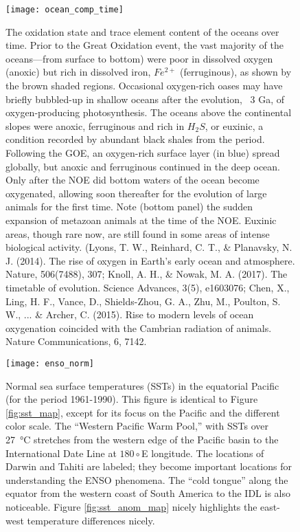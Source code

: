 {\begin{figure}[ht]
\label{fig:historic_sst}
\end{figure}


\newpage
\begin{figure}[ht]
\centering
\texttt{[image: ocean\_comp\_time]}%
\caption{The oxidation state and trace element content of the oceans over time. Prior to the Great Oxidation event, the vast majority of the oceans---from surface to bottom) were poor in dissolved oxygen (anoxic) but rich in dissolved  iron, $Fe^{2+}$ (ferruginous), as shown by the brown shaded regions. Occasional oxygen-rich oases may have briefly bubbled-up in shallow oceans after the evolution, ~3 Ga, of oxygen-producing photosynthesis. The oceans above the continental slopes were anoxic, ferruginous and rich in $H_2S$, or euxinic, a condition recorded by abundant black shales from the period. Following the GOE, an oxygen-rich surface layer (in blue) spread globally, but anoxic and ferruginous continued in the deep ocean. Only after the NOE did bottom waters of the ocean become oxygenated, allowing soon thereafter for the evolution of large animals for the first time. Note (bottom panel) the sudden expansion of metazoan animals at the time of the NOE. Euxinic areas, though rare now, are still found in some areas of intense biological activity. (Lyons, T. W., Reinhard, C. T., \& Planavsky, N. J. (2014). The rise of oxygen in Earth's early ocean and atmosphere. Nature, 506(7488), 307; Knoll, A. H., \& Nowak, M. A. (2017). The timetable of evolution. Science Advances, 3(5), e1603076; Chen, X., Ling, H. F., Vance, D., Shields-Zhou, G. A., Zhu, M., Poulton, S. W., ... \& Archer, C. (2015). Rise to modern levels of ocean oxygenation coincided with the Cambrian radiation of animals. Nature Communications, 6, 7142.}   
\label{fig:ocean_comp}
\end{figure} 

\newpage
\begin{figure}[ht]
\centering
\texttt{[image: enso\_norm]}%
\caption{Normal sea surface temperatures (SSTs) in the equatorial Pacific (for the period 1961-1990). This figure is identical to Figure \ref{fig:sst_map}, except for its focus on the Pacific and the different color scale. The ``Western Pacific Warm Pool,'' with SSTs over \SI{27}{\celsius} stretches from the western edge of the Pacific basin to the International Date Line at $180\circ$E longitude. The locations of Darwin and Tahiti are labeled; they become important locations for understanding the ENSO phenomena. The ``cold tongue'' along the equator from the western coast of South America to the IDL is also noticeable. Figure \ref{fig:sst_anom_map} nicely highlights the east-west temperature differences nicely.} 
\label{fig:enso_norm}
\end{figure} 

}
